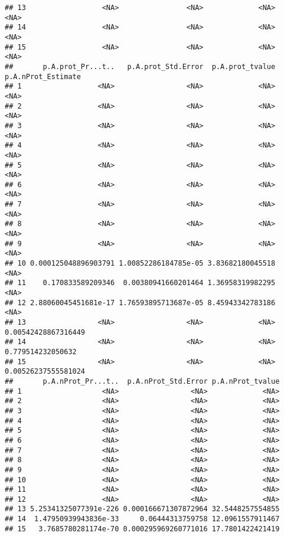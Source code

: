 \documentclass[
]{book}
\begin{document}
\begin{verbatim}
## 13                  <NA>                <NA>             <NA>                 <NA>
## 14                  <NA>                <NA>             <NA>                 <NA>
## 15                  <NA>                <NA>             <NA>                 <NA>
##       p.A.prot_Pr...t..   p.A.prot_Std.Error  p.A.prot_tvalue  p.A.nProt_Estimate
## 1                  <NA>                 <NA>             <NA>                <NA>
## 2                  <NA>                 <NA>             <NA>                <NA>
## 3                  <NA>                 <NA>             <NA>                <NA>
## 4                  <NA>                 <NA>             <NA>                <NA>
## 5                  <NA>                 <NA>             <NA>                <NA>
## 6                  <NA>                 <NA>             <NA>                <NA>
## 7                  <NA>                 <NA>             <NA>                <NA>
## 8                  <NA>                 <NA>             <NA>                <NA>
## 9                  <NA>                 <NA>             <NA>                <NA>
## 10 0.000125048896903791 1.00852286184785e-05 3.83682180045518                <NA>
## 11    0.170833589209346  0.00380941660201464 1.36958319982295                <NA>
## 12 2.88060045451681e-17 1.76593895713687e-05 8.45943342783186                <NA>
## 13                 <NA>                 <NA>             <NA> 0.00542428867316449
## 14                 <NA>                 <NA>             <NA>   0.779514232050632
## 15                 <NA>                 <NA>             <NA> 0.00526237555581024
##       p.A.nProt_Pr...t..  p.A.nProt_Std.Error p.A.nProt_tvalue
## 1                   <NA>                 <NA>             <NA>
## 2                   <NA>                 <NA>             <NA>
## 3                   <NA>                 <NA>             <NA>
## 4                   <NA>                 <NA>             <NA>
## 5                   <NA>                 <NA>             <NA>
## 6                   <NA>                 <NA>             <NA>
## 7                   <NA>                 <NA>             <NA>
## 8                   <NA>                 <NA>             <NA>
## 9                   <NA>                 <NA>             <NA>
## 10                  <NA>                 <NA>             <NA>
## 11                  <NA>                 <NA>             <NA>
## 12                  <NA>                 <NA>             <NA>
## 13 5.25341325077391e-226 0.000166671307872964 32.5448257554855
## 14  1.47950939943836e-33     0.06444313759758 12.0961557911467
## 15   3.7685780281174e-70 0.000295969260771016 17.7801422421419
\end{verbatim}
\end{document}
